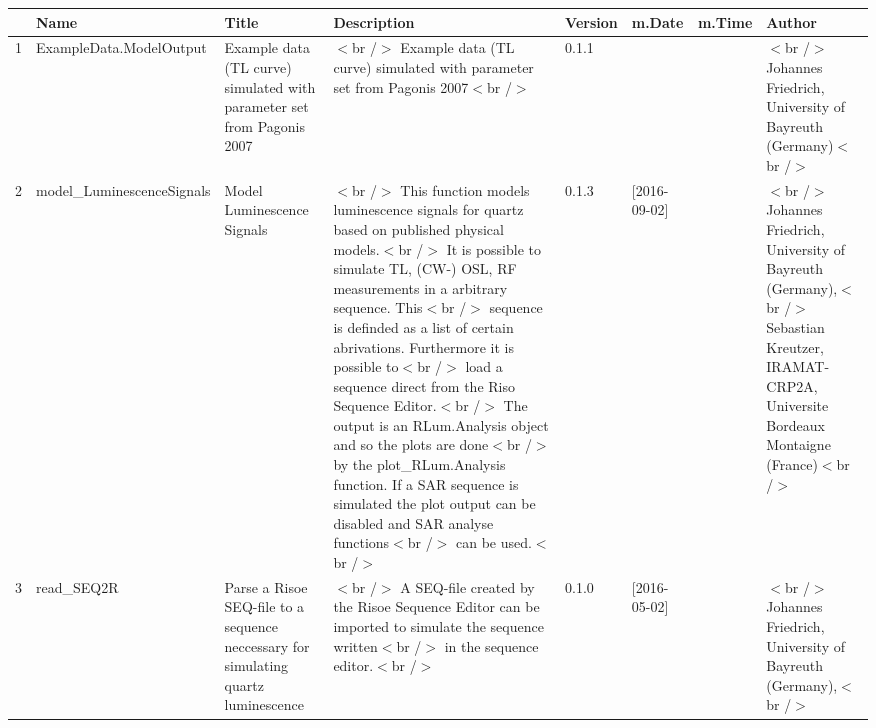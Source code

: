 \begin{table}[ht]
\centering
\begin{tabular}{rlllllll}
  \hline
 & Name & Title & Description & Version & m.Date & m.Time & Author \\ 
  \hline
1 & ExampleData.ModelOutput & Example data (TL curve) simulated with parameter set from Pagonis 2007 & $<$br /$>$ Example data (TL curve) simulated with parameter set from Pagonis 2007$<$br /$>$ & 0.1.1
 &  &  & $<$br /$>$ Johannes Friedrich, University of Bayreuth (Germany)$<$br /$>$ \\ 
  2 & model\_LuminescenceSignals & Model Luminescence Signals & $<$br /$>$ This function models luminescence signals for quartz based on published physical models.$<$br /$>$ It is possible to simulate TL, (CW-) OSL, RF measurements in a arbitrary sequence. This$<$br /$>$ sequence is definded as a  list  of certain abrivations. Furthermore it is possible to$<$br /$>$ load a sequence direct from the Riso Sequence Editor.$<$br /$>$ The output is an  RLum.Analysis object and so the plots are done$<$br /$>$ by the  plot\_RLum.Analysis  function. If a SAR sequence is simulated the plot output can be disabled and SAR analyse functions$<$br /$>$ can be used.$<$br /$>$ & 0.1.3 & [2016-09-02]
 &  & $<$br /$>$ Johannes Friedrich, University of Bayreuth (Germany),$<$br /$>$ Sebastian Kreutzer, IRAMAT-CRP2A, Universite Bordeaux Montaigne (France)$<$br /$>$ \\ 
  3 & read\_SEQ2R & Parse a Risoe SEQ-file to a sequence neccessary for simulating quartz luminescence & $<$br /$>$ A SEQ-file created by the Risoe Sequence Editor can be imported to simulate the sequence written$<$br /$>$ in the sequence editor.$<$br /$>$ & 0.1.0 & [2016-05-02]
 &  & $<$br /$>$ Johannes Friedrich, University of Bayreuth (Germany),$<$br /$>$ \\ 
   \hline
\end{tabular}
\end{table}

